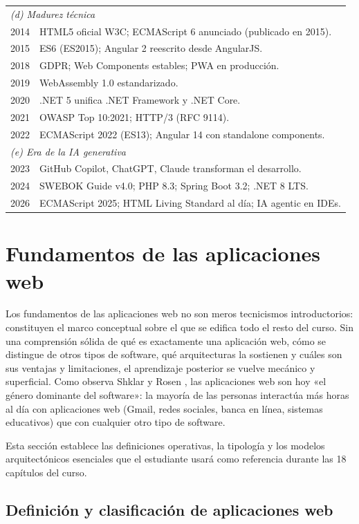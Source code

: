 \begin{table}[!htb]
\begin{tabularx}{\textwidth}{lX}
\midrule
\multicolumn{2}{l}{\emph{(d) Madurez técnica}}\\
2014 & HTML5 oficial W3C; ECMAScript 6 anunciado (publicado en 2015).\\
2015 & ES6 (ES2015); Angular 2 reescrito desde AngularJS.\\
2018 & GDPR; Web Components estables; PWA en producción.\\
2019 & WebAssembly 1.0 estandarizado.\\
2020 & .NET 5 unifica .NET Framework y .NET Core.\\
2021 & OWASP Top 10:2021; HTTP/3 (RFC 9114).\\
2022 & ECMAScript 2022 (ES13); Angular 14 con standalone components.\\
\midrule
\multicolumn{2}{l}{\emph{(e) Era de la IA generativa}}\\
2023 & GitHub Copilot, ChatGPT, Claude transforman el desarrollo.\\
2024 & SWEBOK Guide v4.0; PHP 8.3; Spring Boot 3.2; .NET 8 LTS.\\
2026 & ECMAScript 2025; HTML Living Standard al día; IA agentic en IDEs.\\
\bottomrule
\end{tabularx}
\end{table}

\section{Fundamentos de las aplicaciones web}

Los fundamentos de las aplicaciones web no son meros tecnicismos
introductorios: constituyen el marco conceptual sobre el que se
edifica todo el resto del curso. Sin una comprensión sólida de qué
es exactamente una aplicación web, cómo se distingue de otros tipos
de software, qué arquitecturas la sostienen y cuáles son sus ventajas
y limitaciones, el aprendizaje posterior se vuelve mecánico y
superficial. Como observa Shklar y Rosen \cite{shklar2009web}, las
aplicaciones web son hoy «el género dominante del software»: la
mayoría de las personas interactúa más horas al día con aplicaciones
web (Gmail, redes sociales, banca en línea, sistemas educativos) que
con cualquier otro tipo de software.

Esta sección establece las definiciones operativas, la tipología y
los modelos arquitectónicos esenciales que el estudiante usará como
referencia durante las 18 capítulos del curso.

\subsection{Definición y clasificación de aplicaciones web}

